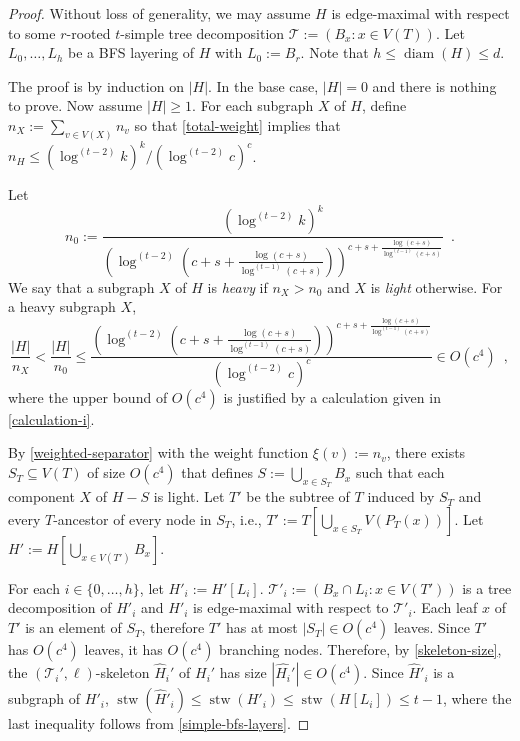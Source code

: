 \documentclass[kpfonts]{patmorin}
\newcommand{\defin}[1]{\emph{\color{brightmaroon}#1}}
\DeclareMathOperator{\diam}{diam}
\DeclareMathOperator{\stw}{stw}
\theoremstyle{named}
\begin{document}
\begin{proof}
    Without loss of generality, we may assume $H$ is edge-maximal with respect to some $r$-rooted $t$-simple tree decomposition $\mathcal{T}:=(B_x:x\in V(T))$.  Let $L_0,\ldots,L_h$ be a BFS layering of $H$ with $L_0:=B_r$.  Note that $h\le\diam(H)\le d$.

    The proof is by induction on $|H|$.  In the base case, $|H|=0$ and there is nothing to prove. Now assume $|H|\ge 1$.  For each subgraph $X$ of $H$, define $n_{X}:=\sum_{v\in V(X)} n_v$ so that \cref{total-weight} implies that $n_H\le(\log^{(t-2)} k)^k/(\log^{(t-2)}c)^c$.

    Let
    \begin{equation}
        n_0 := \frac{(\log^{(t-2)} k)^k}{\left(\log^{(t-2)}\left(c+s+\tfrac{\log(c+s)}{\log^{(t-1)}(c+s)}\right)\right)^{c+s+\tfrac{\log(c+s)}{\log^{(t-1)}(c+s)}}} \enspace . \label{heavy-def}
    \end{equation}
    We say that a subgraph $X$ of $H$ is \defin{heavy} if $n_X>n_0$ and $X$ is \defin{light} otherwise.  For a heavy subgraph $X$,
    \begin{equation}
        \frac{|H|}{n_X} < \frac{|H|}{n_0}
        \le \frac{\left(\log^{(t-2)}\left(c+s+\tfrac{\log(c+s)}{\log^{(t-1)}(c+s)}\right)\right)^{c+s+\tfrac{\log(c+s)}{\log^{(t-1)}(c+s)}}}{(\log^{(t-2)} c)^c}
         \in O\left(c^4\right)
    \enspace ,
    \end{equation}
    where the upper bound of $O(c^4)$ is justified by a calculation given in \cref{calculation-i}.

    By \cref{weighted-separator} with the weight function $\xi(v):=n_v$, there exists $S_T\subseteq V(T)$ of size $O(c^4)$ that defines $S:=\bigcup_{x\in S_T} B_x$ such that each component $X$ of $H-S$ is light.  Let $T'$ be the subtree of $T$ induced by $S_T$ and every $T$-ancestor of every node in $S_T$, i.e., $T':=T[\bigcup_{x\in S_T} V(P_T(x))]$. Let $H':=H[\bigcup_{x\in V(T')} B_x]$.

    For each $i\in\{0,\ldots,h\}$, let $H'_i:=H'[L_i]$.   $\mathcal{T}'_i:=(B_x\cap L_i: x\in V(T'))$ is a tree decomposition of $H'_i$ and $H'_i$ is edge-maximal with respect to $\mathcal{T}'_i$.  Each leaf $x$ of $T'$ is an element of $S_T$, therefore $T'$ has at most $|S_T|\in O(c^4)$ leaves. Since $T'$ has $O(c^4)$ leaves, it has $O(c^4)$ branching nodes.  Therefore, by \cref{skeleton-size}, the $(\mathcal{T}_i',\ell)$-skeleton $\hat{H}_i'$ of $H_i'$ has size $|\hat{H_i}'|\in O(c^4)$.  Since $\hat{H}'_i$ is a subgraph of $H'_i$, $\stw(\hat{H}'_i)\le\stw(H'_i)\le\stw(H[L_i])\le t-1$, where the last inequality follows from \cref{simple-bfs-layers}.


\end{proof}
\end{document}
